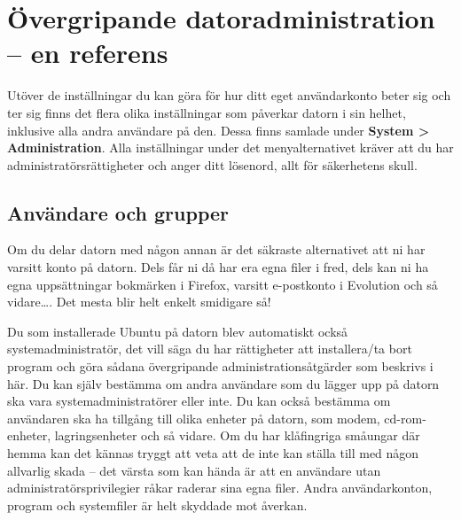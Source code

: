\documentclass[a4paper,final]{memoir} %
\begin{document}




\section[Övergripande datoradministration -- en referens]{Övergripande datoradministration \\-- en referens}

Utöver de inställningar du kan göra för hur ditt eget användarkonto beter sig och ter sig finns det flera olika inställningar som påverkar datorn i sin helhet, inklusive alla andra användare på den. Dessa finns samlade under \textbf{System \textgreater{} Administration}. Alla inställningar under det menyalternativet kräver att du har administratörsrättigheter och anger ditt lösenord, allt för säkerhetens skull.

\subsection{Användare och grupper}


Om du delar datorn med någon annan är det säkraste alternativet att ni har varsitt konto på datorn. Dels får ni då har era egna filer i fred, dels kan ni ha egna uppsättningar bokmärken i Firefox, varsitt e-postkonto i Evolution och så vidare\ldots{}. Det mesta blir helt enkelt smidigare så!

Du som installerade Ubuntu på datorn blev automatiskt också systemadministratör, det vill säga du har rättigheter att installera/ta bort program och göra sådana övergripande administrationsåtgärder som beskrivs i här. Du kan själv bestämma om andra användare som du lägger upp på datorn ska vara systemadministratörer eller inte. Du kan också bestämma om användaren ska ha tillgång till olika enheter på datorn, som modem, cd-rom-enheter, lagringsenheter och så vidare. Om du har klåfingriga småungar där hemma kan det kännas tryggt att veta att de inte kan ställa till med någon allvarlig skada -- det värsta som kan hända är att en användare utan administratörsprivilegier råkar raderar sina egna filer. Andra användarkonton, program och systemfiler är helt skyddade mot åverkan.
\end{document}
